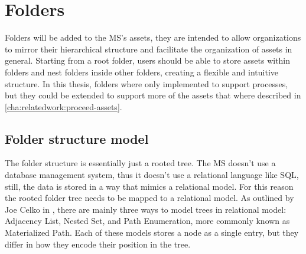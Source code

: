 
%

\section{Folders}
\label{cha:conceptanddesign:folders}

Folders will be added to the MS's assets,
they are intended to allow organizations to mirror their hierarchical structure and
facilitate the organization of assets in general.
Starting from a root folder, users should be able to store assets within folders and nest
folders inside other folders, creating a flexible and intuitive structure. 
In this thesis, folders where only implemented to support processes, but they could be extended to
support more of the assets that where described in \ref{cha:relatedwork:proceed-assets}.

\subsection{Folder structure model}


The folder structure is essentially just a rooted tree.
The MS doesn't use a database management system, thus it doesn't use a relational
language like SQL, still, the data is stored in a way that mimics a relational model.
For this reason the rooted folder tree needs to be mapped to a relational model.
%
As outlined by Joe Celko in \cite{celkoSQLTrees}, there are mainly three ways to model
trees in relational model:
Adjacency List, Nested Set, and  Path Enumeration, more commonly known as Materialized Path.
Each of these models stores a node as a single entry, but they differ in how they encode
their position in the tree.

